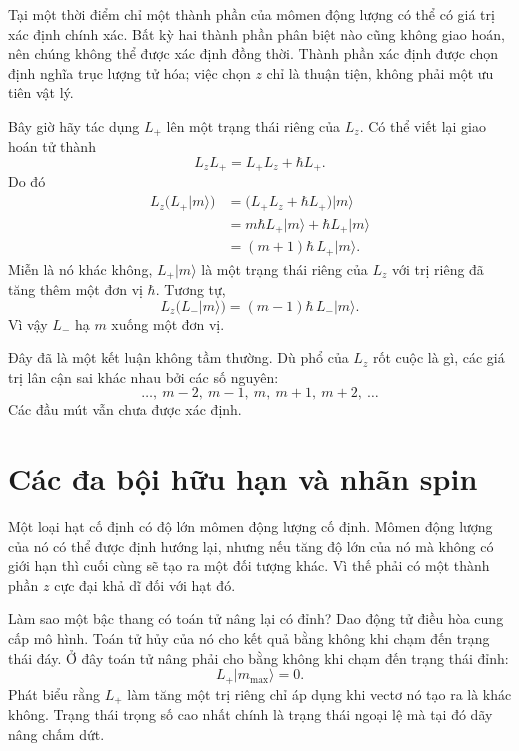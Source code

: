 Tại một thời điểm chỉ một thành phần của mômen động lượng có thể có giá trị xác định chính xác. Bất kỳ hai thành phần phân biệt nào cũng không giao hoán, nên chúng không thể được xác định đồng thời. Thành phần xác định được chọn định nghĩa trục lượng tử hóa; việc chọn \(z\) chỉ là thuận tiện, không phải một ưu tiên vật lý.

Bây giờ hãy tác dụng \(L_+\) lên một trạng thái riêng của \(L_z\). Có thể viết lại giao hoán tử thành
\begin{equation}
L_zL_+=L_+L_z+\hbar L_+.
\end{equation}
Do đó
\begin{align}
L_z\bigl(L_+\lvert m\rangle\bigr)
&=\bigl(L_+L_z+\hbar L_+\bigr)\lvert m\rangle \\
&=m\hbar L_+\lvert m\rangle+\hbar L_+\lvert m\rangle \\
&=(m+1)\hbar\,L_+\lvert m\rangle.
\end{align}
Miễn là nó khác không, \(L_+\lvert m\rangle\) là một trạng thái riêng của \(L_z\) với trị riêng đã tăng thêm một đơn vị \(\hbar\). Tương tự,
\begin{equation}
L_z\bigl(L_-\lvert m\rangle\bigr)
=(m-1)\hbar\,L_-\lvert m\rangle.
\end{equation}
Vì vậy \(L_-\) hạ \(m\) xuống một đơn vị.

Đây đã là một kết luận không tầm thường. Dù phổ của \(L_z\) rốt cuộc là gì, các giá trị lân cận sai khác nhau bởi các số nguyên:
\begin{equation}
\ldots,\ m-2,\ m-1,\ m,\ m+1,\ m+2,\ \ldots
\end{equation}
Các đầu mút vẫn chưa được xác định.

\section{Các đa bội hữu hạn và nhãn spin}

Một loại hạt cố định có độ lớn mômen động lượng cố định. Mômen động lượng của nó có thể được định hướng lại, nhưng nếu tăng độ lớn của nó mà không có giới hạn thì cuối cùng sẽ tạo ra một đối tượng khác. Vì thế phải có một thành phần \(z\) cực đại khả dĩ đối với hạt đó.

Làm sao một bậc thang có toán tử nâng lại có đỉnh? Dao động tử điều hòa cung cấp mô hình. Toán tử hủy của nó cho kết quả bằng không khi chạm đến trạng thái đáy. Ở đây toán tử nâng phải cho bằng không khi chạm đến trạng thái đỉnh:
\begin{equation}
L_+\lvert m_{\max}\rangle=0.
\end{equation}
Phát biểu rằng \(L_+\) làm tăng một trị riêng chỉ áp dụng khi vectơ nó tạo ra là khác không. Trạng thái trọng số cao nhất chính là trạng thái ngoại lệ mà tại đó dãy nâng chấm dứt.

